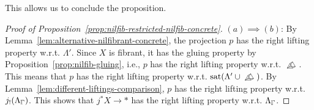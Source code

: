 This allows us to conclude the proposition.

\begin{proof}[Proof of Proposition~\ref{prop:nilfib-restricted-nilfib-concrete}]
$(a)\implies (b)$:
By Lemma~\ref{lem:alternative-nilfibrant-concrete}, the projection $p$ has the right lifting property w.r.t. $\Lambda'$.
Since $X$ is fibrant, it has the gluing property by Proposition~\ref{prop:nilfib-gluing},
i.e., $p$ has the right lifting property w.r.t. $\bprism$.
This means that $p$ has the right lifting property w.r.t. $\mathrm{sat}(\Lambda'\cup\bprism)$.
By Lemma~\ref{lem:different-liftings-comparison}, $p$ has the right lifting property w.r.t. $j_!(\Lambda_{\bbGamma})$.
This shows that $j^\ast X\to\ast$ has the right lifting property w.r.t. $\Lambda_{\bbGamma}$.
\end{proof}
